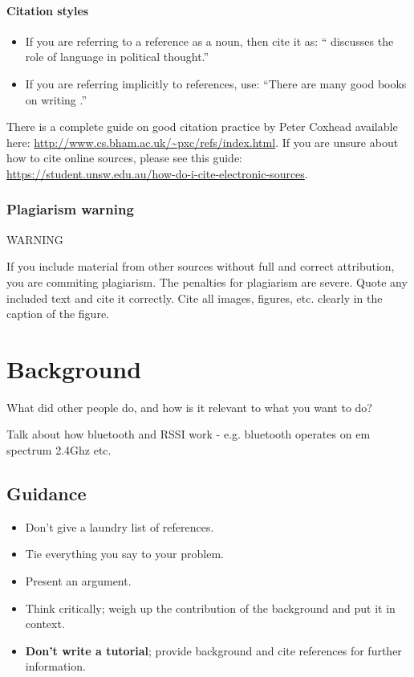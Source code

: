 \documentclass{l4proj}
\begin{document}
\subsubsection{Citation styles}

\begin{itemize}
    \item If you are referring to a reference as a noun, then cite it as: ``\citet{Orw68} discusses the role of language in political thought.''
    \item If you are referring implicitly to references, use: ``There are many good books on writing \citep{Orw68, Wil09, Pin15}.''
\end{itemize}

There is a complete guide on good citation practice by Peter Coxhead available here: \url{http://www.cs.bham.ac.uk/~pxc/refs/index.html}. 
If you are unsure about how to cite online sources, please see this guide: \url{https://student.unsw.edu.au/how-do-i-cite-electronic-sources}.

\subsection{Plagiarism warning}

\begin{highlight_title}{WARNING}
    
    If you include material from other sources without full and correct attribution, you are commiting plagiarism. The penalties for plagiarism are severe.
    Quote any included text and cite it correctly. Cite all images, figures, etc. clearly in the caption of the figure.
\end{highlight_title}


\chapter{Background}
What did other people do, and how is it relevant to what you want to do?

Talk about how bluetooth and RSSI work - e.g. bluetooth operates on em spectrum 2.4Ghz etc.
\section{Guidance}
\begin{itemize}    
    \item
          Don't give a laundry list of references.
    \item
          Tie everything you say to your problem.
    \item
          Present an argument.
    \item Think critically; weigh up the contribution of the background and put it in context.
    \item
          \textbf{Don't write a tutorial}; provide background and cite
          references for further information.
\end{itemize}
\end{document}
